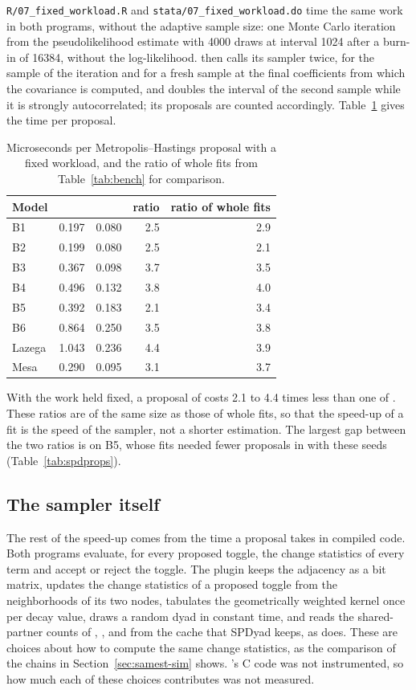 \texttt{R/07\_fixed\_workload.R} and \texttt{stata/07\_fixed\_workload.do} time the same work in both programs, without the adaptive sample size: one Monte Carlo iteration from the pseudolikelihood estimate with 4000 draws at interval 1024 after a burn-in of 16384, without the log-likelihood. \nwergm{} then calls its sampler twice, for the sample of the iteration and for a fresh sample at the final coefficients from which the covariance is computed, and doubles the interval of the second sample while it is strongly autocorrelated; its proposals are counted accordingly. Table~\ref{tab:fixedwork} gives the time per proposal.

\begin{table}[htbp]
\centering\small
\caption{Microseconds per Metropolis--Hastings proposal with a fixed workload, and the ratio of whole fits from Table~\ref{tab:bench} for comparison.}\label{tab:fixedwork}
\begin{tabular}{@{}lrrrr@{}}
\toprule
Model & \ergm{} & \nwergm{} & ratio & ratio of whole fits\\
\midrule
B1 & 0.197 & 0.080 & 2.5 & 2.9\\
B2 & 0.199 & 0.080 & 2.5 & 2.1\\
B3 & 0.367 & 0.098 & 3.7 & 3.5\\
B4 & 0.496 & 0.132 & 3.8 & 4.0\\
B5 & 0.392 & 0.183 & 2.1 & 3.4\\
B6 & 0.864 & 0.250 & 3.5 & 3.8\\
Lazega & 1.043 & 0.236 & 4.4 & 3.9\\
Mesa & 0.290 & 0.095 & 3.1 & 3.7\\
\bottomrule
\end{tabular}
\end{table}

With the work held fixed, a proposal of \nwergm{} costs 2.1 to 4.4 times less than one of \ergm{}. These ratios are of the same size as those of whole fits, so that the speed-up of a fit is the speed of the sampler, not a shorter estimation. The largest gap between the two ratios is on B5, whose fits needed fewer proposals in \nwergm{} with these seeds (Table~\ref{tab:spdprops}).

\subsection{The sampler itself}

The rest of the speed-up comes from the time a proposal takes in compiled code. Both programs evaluate, for every proposed toggle, the change statistics of every term and accept or reject the toggle. The plugin keeps the adjacency as a bit matrix, updates the change statistics of a proposed toggle from the neighborhoods of its two nodes, tabulates the geometrically weighted kernel once per decay value, draws a random dyad in constant time, and reads the shared-partner counts of , ,  and  from the cache that SPDyad keeps, as \ergm{} does. These are choices about how to compute the same change statistics, as the comparison of the chains in Section~\ref{sec:samest-sim} shows. \ergm{}'s C code was not instrumented, so how much each of these choices contributes was not measured.

